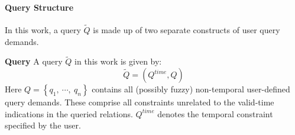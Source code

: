 




\paragraph{\textbf{Query Structure}}
In this work, a query $\tilde{Q}$ is made up of two separate constructs of user query demands.


\begin{svgraybox}
\vspace{-10pt}
\begin{definition}
\textbf{Query}
A query $\tilde{Q}$ in this work is given by:
\begin{equation}
\label{eq:query-specification}
\tilde{Q} = \left( Q^{time}, Q \right)
\end{equation}
Here $Q = \left \lbrace q_1,\ \cdots,\ q_n \right \rbrace$ contains all (possibly fuzzy) non-temporal user-defined query demands. These comprise all constraints unrelated to the valid-time indications in the queried relations. $Q^{time}$ denotes the temporal constraint specified by the user.
\end{definition}
\vspace{-10pt}
\end{svgraybox}

